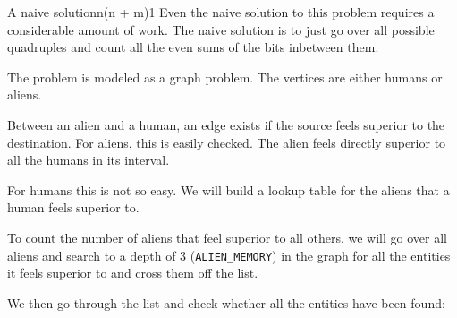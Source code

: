 \documentclass{writeup}
\begin{document}
\begin{solutions}
  \begin{solution}{A naive solution}{n(n + m)}{1}
    Even the naive solution to this problem requires a considerable amount of work.
    The naive solution is to just go over all possible quadruples and count all the even sums of the bits inbetween them.

    The problem is modeled as a graph problem.
    The vertices are either humans or aliens.


    Between an alien and a human, an edge exists if the source feels superior to the destination.
    For aliens, this is easily checked.
    The alien feels directly superior to all the humans in its interval.


    For humans this is not so easy.
    We will build a lookup table for the aliens that a human feels superior to.


    To count the number of aliens that feel superior to all others, we will go over all aliens and search to a depth of $3$ (\texttt{ALIEN_MEMORY}) in the graph for all the entities it feels superior to and cross them off the list.


    We then go through the list and check whether all the entities have been found:

  \end{solution}
\end{solutions}
\end{document}
